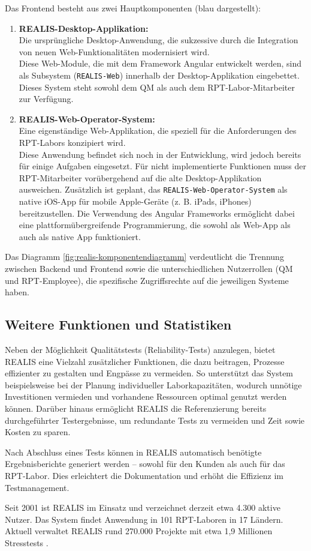 Das Frontend besteht aus zwei Hauptkomponenten (blau dargestellt):
\begin{enumerate}
    \item \textbf{REALIS-Desktop-Applikation:} \\
Die ursprüngliche Desktop-Anwendung, die sukzessive durch die Integration von neuen Web-Funktionalitäten modernisiert wird.\\
Diese Web-Module, die mit dem Framework Angular entwickelt werden, sind als Subsystem (\texttt{REALIS-Web}) innerhalb der Desktop-Applikation eingebettet. Dieses System steht sowohl dem \gls{QM} als auch dem \gls{RPT}-Labor-Mitarbeiter zur Verfügung.

\item \textbf{REALIS-Web-Operator-System:} \\
Eine eigenständige Web-Applikation, die speziell für die Anforderungen des \gls{RPT}-Labors konzipiert wird. \\
Diese Anwendung befindet sich noch in der Entwicklung, wird jedoch bereits für einige Aufgaben eingesetzt. Für nicht implementierte Funktionen muss der \gls{RPT}-Mitarbeiter vorübergehend auf die alte Desktop-Applikation ausweichen. Zusätzlich ist geplant, das \texttt{REALIS-Web-Operator-System} als native iOS-App für mobile Apple-Geräte (z. B. iPads, iPhones) bereitzustellen. Die Verwendung des Angular Frameworks ermöglicht dabei eine plattformübergreifende Programmierung, die sowohl als Web-App als auch als native App funktioniert.
\end{enumerate}

Das Diagramm \ref{fig:realis-komponentendiagramm} verdeutlicht die Trennung zwischen Backend und Frontend sowie die unterschiedlichen Nutzerrollen (\gls{QM} und \gls{RPT}-Employee), die spezifische Zugriffsrechte auf die jeweiligen Systeme haben.


\subsection{Weitere Funktionen und Statistiken}
Neben der Möglichkeit Qualitätstests (Reliability-Tests) anzulegen, bietet \gls{REALIS} eine Vielzahl zusätzlicher Funktionen, die dazu beitragen, Prozesse effizienter zu gestalten und Engpässe zu vermeiden. So unterstützt das System beispielsweise bei der Planung individueller Laborkapazitäten, wodurch unnötige Investitionen vermieden und vorhandene Ressourcen optimal genutzt werden können. Darüber hinaus ermöglicht \gls{REALIS} die Referenzierung bereits durchgeführter Testergebnisse, um redundante Tests zu vermeiden und Zeit sowie Kosten zu sparen.

Nach Abschluss eines Tests können in \gls{REALIS} automatisch benötigte Ergebnisberichte generiert werden – sowohl für den Kunden als auch für das \gls{RPT}-Labor. Dies erleichtert die Dokumentation und erhöht die Effizienz im Testmanagement.

Seit 2001 ist \gls{REALIS} im Einsatz und verzeichnet derzeit etwa 4.300 aktive Nutzer. Das System findet Anwendung in 101 \gls{RPT}-Laboren in 17 Ländern. Aktuell verwaltet \gls{REALIS} rund 270.000 Projekte mit etwa 1,9 Millionen Stresstests \cite{REALISPowerPointIntern}.